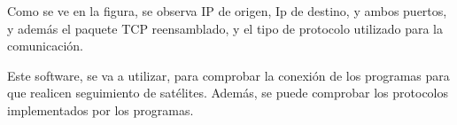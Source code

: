 Como se ve en la figura, se observa IP de origen, Ip de destino, y ambos puertos, y además el paquete TCP reensamblado, y el tipo de protocolo utilizado para la comunicación.  

Este software, se va a utilizar, para comprobar la conexión de los programas para que realicen seguimiento de satélites. Además, se puede comprobar los protocolos implementados por los programas. 

